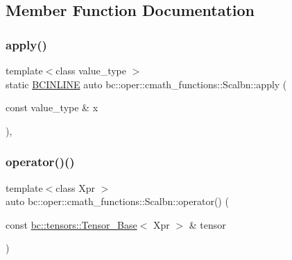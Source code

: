 \subsection{Member Function Documentation}
\mbox{\label{structbc_1_1oper_1_1cmath__functions_1_1Scalbn_a6fa1810b2590260bee13e9dfd0070b41}} 
\subsubsection{\texorpdfstring{apply()}{apply()}}
{\footnotesize\ttfamily template$<$class value\+\_\+type $>$ \\
static \hyperlink{common_8h_a6699e8b0449da5c0fafb878e59c1d4b1}{B\+C\+I\+N\+L\+I\+NE} auto bc\+::oper\+::cmath\+\_\+functions\+::\+Scalbn\+::apply (\begin{DoxyParamCaption}\item[{const value\+\_\+type \&}]{x }\end{DoxyParamCaption})\hspace{0.3cm}{\ttfamily [inline]}, {\ttfamily [static]}}

\mbox{\label{structbc_1_1oper_1_1cmath__functions_1_1Scalbn_af856613b8e711f1c03447bc38d995af0}} 
\subsubsection{\texorpdfstring{operator()()}{operator()()}\hspace{0.1cm}{\footnotesize\ttfamily [1/3]}}
{\footnotesize\ttfamily template$<$class Xpr $>$ \\
auto bc\+::oper\+::cmath\+\_\+functions\+::\+Scalbn\+::operator() (\begin{DoxyParamCaption}\item[{const \hyperlink{classbc_1_1tensors_1_1Tensor__Base}{bc\+::tensors\+::\+Tensor\+\_\+\+Base}$<$ Xpr $>$ \&}]{tensor }\end{DoxyParamCaption})\hspace{0.3cm}{\ttfamily [inline]}}

